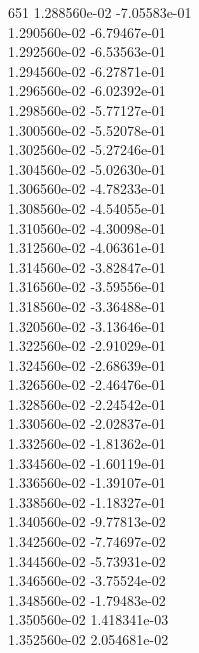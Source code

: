 651	1.288560e-02	-7.05583e-01	\\ 	1.290560e-02	-6.79467e-01	\\ 	1.292560e-02	-6.53563e-01	\\ 	1.294560e-02	-6.27871e-01	\\ 	1.296560e-02	-6.02392e-01	\\ 	1.298560e-02	-5.77127e-01	\\ 	1.300560e-02	-5.52078e-01	\\ 	1.302560e-02	-5.27246e-01	\\ 	1.304560e-02	-5.02630e-01	\\ 	1.306560e-02	-4.78233e-01	\\ 	1.308560e-02	-4.54055e-01	\\ 	1.310560e-02	-4.30098e-01	\\ 	1.312560e-02	-4.06361e-01	\\ 	1.314560e-02	-3.82847e-01	\\ 	1.316560e-02	-3.59556e-01	\\ 	1.318560e-02	-3.36488e-01	\\ 	1.320560e-02	-3.13646e-01	\\ 	1.322560e-02	-2.91029e-01	\\ 	1.324560e-02	-2.68639e-01	\\ 	1.326560e-02	-2.46476e-01	\\ 	1.328560e-02	-2.24542e-01	\\ 	1.330560e-02	-2.02837e-01	\\ 	1.332560e-02	-1.81362e-01	\\ 	1.334560e-02	-1.60119e-01	\\ 	1.336560e-02	-1.39107e-01	\\ 	1.338560e-02	-1.18327e-01	\\ 	1.340560e-02	-9.77813e-02	\\ 	1.342560e-02	-7.74697e-02	\\ 	1.344560e-02	-5.73931e-02	\\ 	1.346560e-02	-3.75524e-02	\\ 	1.348560e-02	-1.79483e-02	\\ 	1.350560e-02	1.418341e-03	\\ 	1.352560e-02	2.054681e-02	\\ \hline
